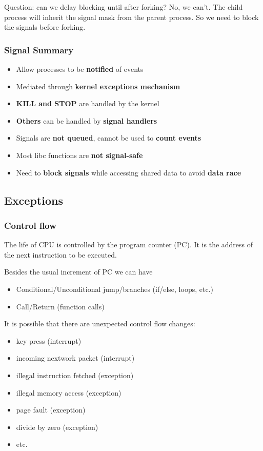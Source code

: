 \documentclass[letterpaper,12pt]{article}
\begin{document}
Question: can we delay blocking until after forking? No, we can't. The child process will inherit the signal mask from the parent process. So we need to block the signals before forking.

\subsubsection{Signal Summary}
\begin{itemize}
    \item Allow processes to be \textbf{notified} of events
    \item Mediated through \textbf{kernel exceptions mechanism}
    \item \textbf{KILL and STOP} are handled by the kernel
    \item \textbf{Others} can be handled by \textbf{signal handlers}
    \item Signals are \textbf{not queued}, cannot be used to \textbf{count events}
    \item Most libc functions are \textbf{not signal-safe}  
    \item Need to \textbf{block signals} while accessing shared data to avoid \textbf{data race}
\end{itemize}
\subsection{Exceptions}
\subsubsection{Control flow}
The life of CPU is controlled by the program counter (PC). It is the address of the next instruction to be executed.

Besides the usual increment of PC we can have \begin{itemize}
    \item Conditional/Unconditional jump/branches (if/else, loops, etc.)
    \item Call/Return (function calls)
\end{itemize}
It is possible that there are unexpected control flow changes:\begin{itemize}
    \item key press (interrupt)
    \item incoming nextwork packet (interrupt)
    \item illegal instruction fetched (exception)
    \item illegal memory access (exception)
    \item page fault (exception)
    \item divide by zero (exception)
    \item etc.
\end{itemize}
\end{document}
